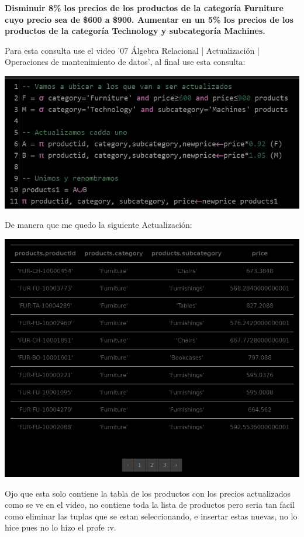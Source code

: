 \textbf{Disminuir 8\% los precios de los productos de la categoría Furniture cuyo precio sea de \$600 a \$900. Aumentar en
un 5\% los precios de los productos de la categoría Technology y subcategoría Machines.} \vspace{.3cm}

Para esta consulta  use el video '07 Álgebra Relacional | Actualización | Operaciones de mantenimiento de datos', al final use esta consulta:

\begin{center}
    \includegraphics[width=14cm]{resources/pregunta2/3.5.1.png}
\end{center}

De manera que me quedo la siguiente Actualización:

\begin{center}
    \includegraphics[width=14cm]{resources/pregunta2/3.5.2.png}
\end{center}

Ojo que esta solo contiene la tabla de los productos con los precios actualizados como se ve en el video, no contiene toda la lista de productos pero seria tan facil como eliminar las tuplas que se estan seleccionando, e insertar estas nuevas, no lo hice pues no lo hizo el profe :v.
\newpage        